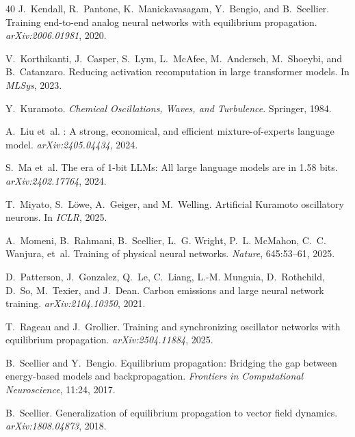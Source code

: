\documentclass[11pt,a4paper]{article}
\begin{document}
\begin{thebibliography}{40}
J.~Kendall, R.~Pantone, K.~Manickavasagam, Y.~Bengio, and B.~Scellier.
\newblock Training end-to-end analog neural networks with equilibrium
  propagation.
\newblock \emph{arXiv:2006.01981}, 2020.

V.~Korthikanti, J.~Casper, S.~Lym, L.~McAfee, M.~Andersch, M.~Shoeybi,
  and B.~Catanzaro.
\newblock Reducing activation recomputation in large transformer models.
\newblock In \emph{MLSys}, 2023.

Y.~Kuramoto.
\newblock \emph{Chemical Oscillations, Waves, and Turbulence}.
\newblock Springer, 1984.

A.~Liu et~al.
: A strong, economical, and efficient mixture-of-experts
  language model.
\newblock \emph{arXiv:2405.04434}, 2024.

S.~Ma et~al.
\newblock The era of 1-bit {LLMs}: All large language models are in 1.58 bits.
\newblock \emph{arXiv:2402.17764}, 2024.

T.~Miyato, S.~L\"owe, A.~Geiger, and M.~Welling.
\newblock Artificial {K}uramoto oscillatory neurons.
\newblock In \emph{ICLR}, 2025.

A.~Momeni, B.~Rahmani, B.~Scellier, L.~G. Wright, P.~L. McMahon,
  C.~C. Wanjura, et~al.
\newblock Training of physical neural networks.
\newblock \emph{Nature}, 645:53--61, 2025.

D.~Patterson, J.~Gonzalez, Q.~Le, C.~Liang, L.-M. Munguia, D.~Rothchild,
  D.~So, M.~Texier, and J.~Dean.
\newblock Carbon emissions and large neural network training.
\newblock \emph{arXiv:2104.10350}, 2021.

T.~Rageau and J.~Grollier.
\newblock Training and synchronizing oscillator networks with equilibrium
  propagation.
\newblock \emph{arXiv:2504.11884}, 2025.

B.~Scellier and Y.~Bengio.
\newblock Equilibrium propagation: Bridging the gap between energy-based models
  and backpropagation.
\newblock \emph{Frontiers in Computational Neuroscience}, 11:24, 2017.

B.~Scellier.
\newblock Generalization of equilibrium propagation to vector field dynamics.
\newblock \emph{arXiv:1808.04873}, 2018.


\end{thebibliography}
\end{document}
